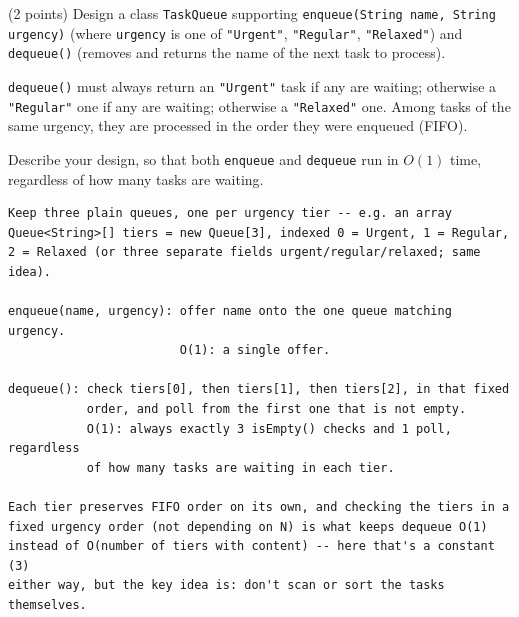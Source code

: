 \begin{question}
(2 points) Design a class \lstinline|TaskQueue| supporting \lstinline|enqueue(String name, String urgency)| (where \lstinline|urgency| is one of \lstinline|"Urgent"|, \lstinline|"Regular"|, \lstinline|"Relaxed"|) and \lstinline|dequeue()| (removes and returns the name of the next task to process).

\lstinline|dequeue()| must always return an \lstinline|"Urgent"| task if any are waiting; otherwise a \lstinline|"Regular"| one if any are waiting; otherwise a \lstinline|"Relaxed"| one. Among tasks of the same urgency, they are processed in the order they were enqueued (FIFO).

Describe your design, so that both \lstinline|enqueue| and \lstinline|dequeue| run in $O(1)$ time, regardless of how many tasks are waiting.

\ifanswers
\begin{verbatim}
Keep three plain queues, one per urgency tier -- e.g. an array
Queue<String>[] tiers = new Queue[3], indexed 0 = Urgent, 1 = Regular,
2 = Relaxed (or three separate fields urgent/regular/relaxed; same idea).

enqueue(name, urgency): offer name onto the one queue matching urgency.
                        O(1): a single offer.

dequeue(): check tiers[0], then tiers[1], then tiers[2], in that fixed
           order, and poll from the first one that is not empty.
           O(1): always exactly 3 isEmpty() checks and 1 poll, regardless
           of how many tasks are waiting in each tier.

Each tier preserves FIFO order on its own, and checking the tiers in a
fixed urgency order (not depending on N) is what keeps dequeue O(1)
instead of O(number of tiers with content) -- here that's a constant (3)
either way, but the key idea is: don't scan or sort the tasks themselves.
\end{verbatim}
\else
\vspace{2.5in}
\fi
\end{question}
